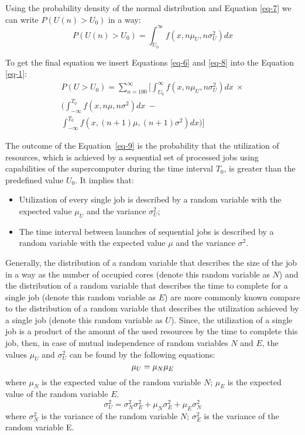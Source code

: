 Using the probability density of the normal distribution and Equation \ref{eq-7} we can write $P(U(n) > U_0)$ in a way:
\begin{equation}
    \label{eq-8}
    P(U(n) > U_0) = \int_{U_0}^{\infty}f(x, n\mu_{U}, n\sigma_{U}^2)dx
\end{equation}

To get the final equation we insert Equations \ref{eq-6} and \ref{eq-8} into the Equation \ref{eq-1}:
\begin{equation}
    \label{eq-9}
    \begin{multlined}
    P(U > U_0) = \sum\limits_{n=100}^{\infty} 
                 \bigg[ \int_{U_0}^{\infty}f(x, n\mu_{U}, n\sigma_{U}^2)dx \  \times \\
                 \bigg( \int_{-\infty}^{T_0}f(x, n\mu, n\sigma^2)dx \  - \\
                 \int_{-\infty}^{T_0}f(x, (n+1)\mu, (n+1)\sigma^2)dx \bigg) \bigg]
    \end{multlined}
\end{equation}

The outcome of the Equation~\ref{eq-9} is the probability that the utilization of resources, which is achieved by a sequential set of processed jobs using capabilities of the supercomputer during the time interval $T_0$, is greater than the predefined value $U_0$. It implies that:
\begin{itemize}
	\item Utilization of every single job is described by a random variable with the expected value $\mu_{U}$ and the variance $\sigma_{U}^2$;
	\item The time interval between launches of sequential jobs is described by a random variable with the expected value $\mu$ and the variance $\sigma^2$.
\end{itemize}

Generally, the distribution of a random variable that describes the size of the job in a way as the number of occupied cores (denote this random variable as $N$) and the distribution of a random variable that describes the time to complete for a single job (denote this random variable as $E$) are more commonly known compare to the distribution of a random variable that describes the utilization achieved by a single job (denote this random variable as $U$). Since, the utilization of a single job is a product of the amount of the used resources by the time to complete this job, then, in case of mutual independence of random variables $N$ and $E$, the values $\mu_U$ and $\sigma_{U}^2$ can be found by the following equations:
\begin{equation}
    \label{eq-10}
    \mu_U = \mu_N \mu_E \\
\end{equation}
where $\mu_N$ is the expected value of the random variable $N$; $\mu_E$ is the expected value of the random variable $E$.
\begin{equation}
    \label{eq-11}
    \sigma_{U}^2 = \sigma_{N}^2 \sigma_{E}^2 + \mu_N \sigma_{E}^2 + \mu_E \sigma_{N}^2
\end{equation}
where $\sigma_{N}^2$ is the variance of the random variable $N$; $\sigma_{E}^2$ is the variance of the random variable E.
